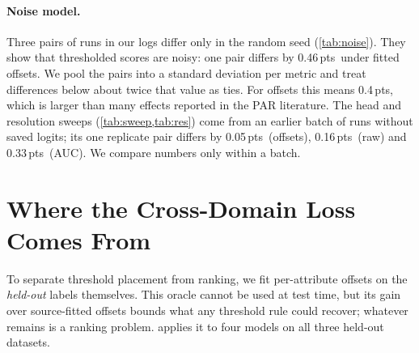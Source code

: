 \documentclass[10pt,twocolumn,letterpaper]{article}
\newcommand{\pts}{\,pts}
\begin{document}
\paragraph{Noise model.} Three pairs of runs in our logs differ only in the random seed (\cref{tab:noise}). They show that thresholded scores are noisy: one pair differs by 0.46\pts\ under fitted offsets. We pool the pairs into a standard deviation per metric and treat differences below about twice that value as ties. For offsets this means 0.4\pts, which is larger than many effects reported in the PAR literature. The head and resolution sweeps (\cref{tab:sweep,tab:res}) come from an earlier batch of runs without saved logits; its one replicate pair differs by 0.05\pts\ (offsets), 0.16\pts\ (raw) and 0.33\pts\ (AUC). We compare numbers only within a batch.

\begin{table}[t]
\centering\small
\setlength{\tabcolsep}{3pt}
\caption{Run-to-run noise from seed-only pairs (values $\times100$). The $\tau$ rule is the least noisy readout of the same logits.}
\label{tab:noise}
\end{table}

\section{Where the Cross-Domain Loss Comes From}
\label{sec:gap}

To separate threshold placement from ranking, we fit per-attribute offsets on the \emph{held-out} labels themselves. This oracle cannot be used at test time, but its gain over source-fitted offsets bounds what any threshold rule could recover; whatever remains is a ranking problem.  applies it to four models on all three held-out datasets.
\end{document}
